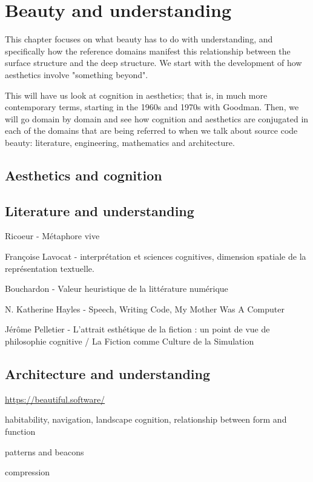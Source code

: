 \chapter{Beauty and understanding}

This chapter focuses on what beauty has to do with understanding, and specifically how the reference domains manifest this relationship between the surface structure and the deep structure. We start with the development of how aesthetics involve "something beyond".

This will have us look at cognition in aesthetics; that is, in much more contemporary terms, starting in the 1960s and 1970s with Goodman. Then, we will go domain by domain and see how cognition and aesthetics are conjugated in each of the domains that are being referred to when we talk about source code beauty: literature, engineering, mathematics and architecture.

\section{Aesthetics and cognition}

\section{Literature and understanding}

Ricoeur - Métaphore vive

Françoise Lavocat - interprétation et sciences cognitives, dimension spatiale de la représentation textuelle.

Bouchardon - Valeur heuristique de la littérature numérique

N. Katherine Hayles - Speech, Writing Code, My Mother Was A Computer

Jérôme Pelletier -  L'attrait esthétique de la fiction : un point de vue de philosophie cognitive /  La Fiction comme Culture de la Simulation 

\section{Architecture and understanding}

\url{https://beautiful.software/}

habitability, navigation, landscape cognition, relationship between form and function

patterns and beacons

compression

